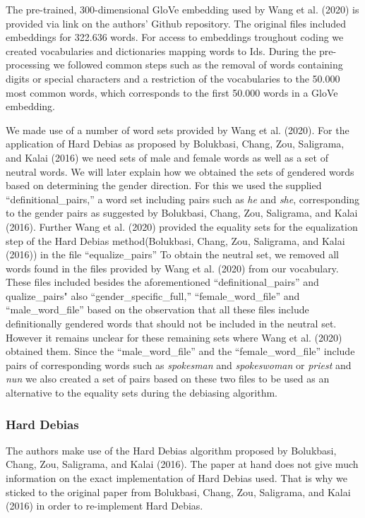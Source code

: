 \documentclass[
  english,
  man,floatsintext]{apa6}
\begin{document}
The pre-trained, 300-dimensional GloVe embedding used by Wang et al. (2020) is provided via link on the authors' Github repository.
The original files included embeddings for 322.636 words. For access to embeddings troughout coding we created vocabularies and dictionaries mapping words to Ids. During the pre-processing we followed common steps such as the removal of words containing digits or special characters and a restriction of the vocabularies to the 50.000 most common words, which corresponds to the first 50.000 words in a GloVe embedding.

We made use of a number of word sets provided by Wang et al. (2020). For the application of Hard Debias as proposed by Bolukbasi, Chang, Zou, Saligrama, and Kalai (2016) we need sets of male and female words as well as a set of neutral words. We will later explain how we obtained the sets of gendered words based on determining the gender direction. For this we used the supplied ``definitional\_pairs,'' a word set including pairs such as \emph{he} and \emph{she}, corresponding to the gender pairs as suggested by Bolukbasi, Chang, Zou, Saligrama, and Kalai (2016). Further Wang et al. (2020) provided the equality sets for the equalization step of the Hard Debias method(Bolukbasi, Chang, Zou, Saligrama, and Kalai (2016)) in the file ``equalize\_pairs'' To obtain the neutral set, we removed all words found in the files provided by Wang et al. (2020) from our vocabulary. These files included besides the aforementioned ``definitional\_pairs'' and qualize\_pairs" also ``gender\_specific\_full,'' ``female\_word\_file'' and ``male\_word\_file'' based on the observation that all these files include definitionally gendered words that should not be included in the neutral set. However it remains unclear for these remaining sets where Wang et al. (2020) obtained them. Since the ``male\_word\_file'' and the ``female\_word\_file'' include pairs of corresponding words such as \emph{spokesman} and \emph{spokeswoman} or \emph{priest} and \emph{nun} we also created a set of pairs based on these two files to be used as an alternative to the equality sets during the debiasing algorithm.

\hypertarget{hard-debias}{%
\subsubsection{Hard Debias}\label{hard-debias}}

The authors make use of the Hard Debias algorithm proposed by Bolukbasi, Chang, Zou, Saligrama, and Kalai (2016). The paper at hand does not give much information on the exact implementation of Hard Debias used. That is why we sticked to the original paper from Bolukbasi, Chang, Zou, Saligrama, and Kalai (2016) in order to re-implement Hard Debias.
\end{document}

